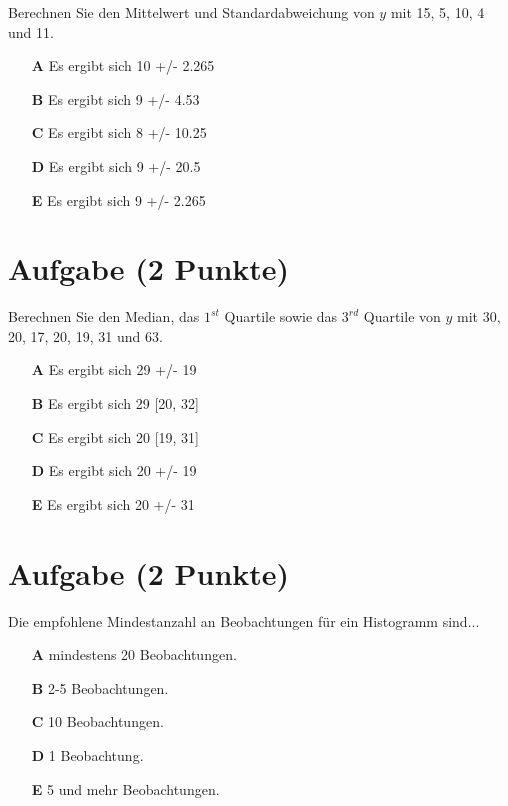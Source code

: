 \documentclass[a4paper, 9pt]{scrartcl}\usepackage[]{graphicx}\usepackage[]{xcolor}
\begin{document}
Berechnen Sie den Mittelwert und Standardabweichung von $y$ mit 15, 5, 10, 4 und 11.



\begin{enumerate}
\item [\textbf{A} \msquare] Es ergibt sich 10 +/- 2.265
\item [\textbf{B} \msquare] Es ergibt sich 9 +/- 4.53
\item [\textbf{C} \msquare] Es ergibt sich 8 +/- 10.25
\item [\textbf{D} \msquare] Es ergibt sich 9 +/- 20.5
\item [\textbf{E} \msquare] Es ergibt sich 9 +/- 2.265
\end{enumerate} 

\section{Aufgabe \hfill (2 Punkte)}




Berechnen Sie den Median, das $1^{st}$ Quartile sowie das $3^{rd}$ Quartile von $y$ mit 30, 20, 17, 20, 19, 31 und 63.



\begin{enumerate}
\item [\textbf{A} \msquare] Es ergibt sich 29 +/- 19
\item [\textbf{B} \msquare] Es ergibt sich 29 [20, 32]
\item [\textbf{C} \msquare] Es ergibt sich 20 [19, 31]
\item [\textbf{D} \msquare] Es ergibt sich 20 +/- 19
\item [\textbf{E} \msquare] Es ergibt sich 20 +/- 31
\end{enumerate} 

\section{Aufgabe \hfill (2 Punkte)}



Die empfohlene Mindestanzahl an Beobachtungen f{\"u}r ein Histogramm sind...



\begin{enumerate}
\item [\textbf{A} \msquare] mindestens 20 Beobachtungen.
\item [\textbf{B} \msquare] 2-5 Beobachtungen.
\item [\textbf{C} \msquare] 10 Beobachtungen.
\item [\textbf{D} \msquare] 1 Beobachtung.
\item [\textbf{E} \msquare] 5 und mehr Beobachtungen.
\end{enumerate} 
\end{document}
